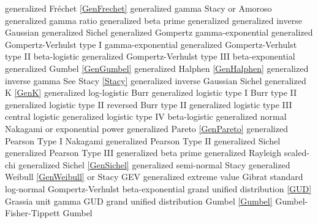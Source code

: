 generalized Fr\'{e}chet 		\dotfill	\eqref{GenFrechet} 					\ncite	%
generalized gamma 				\dotfill	Stacy or Amoroso 					\ncite	%
generalized gamma ratio			\dotfill	generalized beta prime				 	%
generalized generalized inverse Gaussian	\dotfill	generalized Sichel		
generalized Gompertz			\dotfill	gamma-exponential					
generalized Gompertz-Verhulst type I \dotfill	gamma-exponential				    	%
generalized Gompertz-Verhulst type II \dotfill	beta-logistic  					    	%
generalized Gompertz-Verhulst type III \dotfill	beta-exponential 				   		%
generalized Gumbel				\dotfill	\eqref{GenGumbel}					\ncite	%
generalized Halphen				\dotfill	\eqref{GenHalphen}					\ncite
generalized inverse gamma 		\dotfill	See Stacy \eqref{Stacy} 			\ncite	%
generalized inverse Gaussian	\dotfill	Sichel								\ncite
generalized K					\dotfill	\eqref{GenK}						\mcite{\self} 
generalized log-logistic		\dotfill	Burr 								\ncite	%
generalized logistic type I		\dotfill	Burr type II 						\ncite	%
generalized logistic type II	\dotfill	reversed Burr type II 				\ncite	%
generalized logistic type III	\dotfill	central logistic 					\ncite	%
generalized logistic type IV	\dotfill	beta-logistic 						   		%
generalized normal	 			\dotfill	Nakagami or exponential power		\ncite	%
generalized Pareto				\dotfill	\eqref{GenPareto}					\ncite	%
generalized Pearson Type I		\dotfill	Nakagami							
generalized Pearson Type II		\dotfill	generalized Sichel					
generalized Pearson Type III	\dotfill	generalized beta prime				
generalized Rayleigh	 		\dotfill	scaled-chi							\ncite	%
generalized Sichel				\dotfill	\eqref{GenSichel}					\mcite{\self}
generalized semi-normal			\dotfill	Stacy 								   	%
generalized Weibull				\dotfill	\eqref{GenWeibull} or Stacy			\ncite	%
GEV 							\dotfill	generalized extreme value 			\ncite	%
Gibrat							\dotfill	standard log-normal 				\ncite 	%
Gompertz-Verhulst				\dotfill	beta-exponential 					    	%
grand unified distribution		\dotfill	\eqref{GUD}							\mcite{\self}	%
Grassia							\dotfill	unit gamma							
GUD								\dotfill	grand unified distribution			\mcite{\self}	%
Gumbel 							\dotfill	\eqref{Gumbel} 						\ncite	%
Gumbel-Fisher-Tippett			\dotfill	Gumbel 								\ncite 	%

